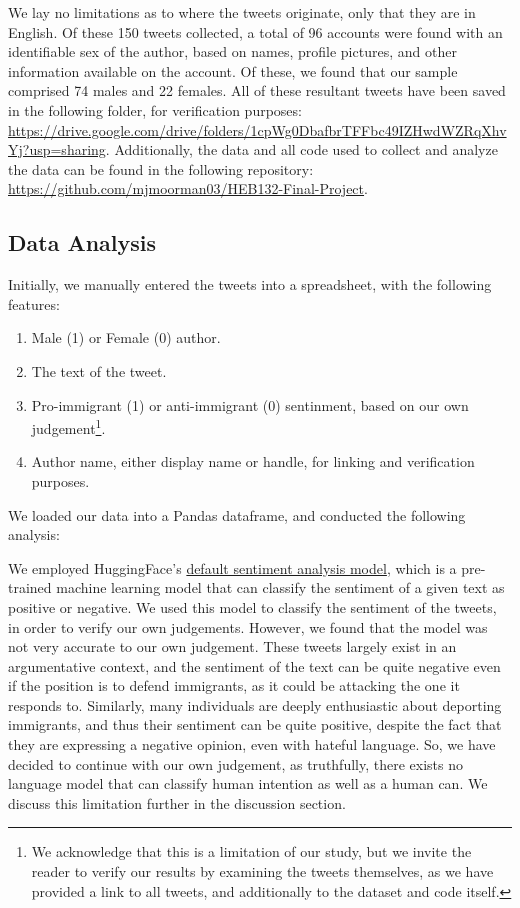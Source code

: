 \documentclass{article}
\begin{document}
We lay no limitations as to where the tweets originate, only that they are in English. Of these 150 tweets collected, a total of 96 accounts were found with an identifiable sex of the author, based on names, profile pictures, and other information available on the account. Of these, we found that our sample comprised 74 males and 22 females. All of these resultant tweets have been saved in the following folder, for verification purposes: \url{https://drive.google.com/drive/folders/1cpWg0DbafbrTFFbc49IZHwdWZRqXhvYj?usp=sharing}. Additionally, the data and all code used to collect and analyze the data can be found in the following repository: \url{https://github.com/mjmoorman03/HEB132-Final-Project}.

\subsection{Data Analysis}
Initially, we manually entered the tweets into a spreadsheet, with the following features:
\begin{enumerate}
    \item Male (1) or Female (0) author.
    \item The text of the tweet.
    \item Pro-immigrant (1) or anti-immigrant (0) sentinment, based on our own judgement\footnote{We acknowledge that this is a limitation of our study, but we invite the reader to verify our results by examining the tweets themselves, as we have provided a link to all tweets, and additionally to the dataset and code itself.}.
    \item Author name, either display name or handle, for linking and verification purposes.
\end{enumerate}

We loaded our data into a Pandas dataframe, and conducted the following analysis:

We employed HuggingFace's \href{https://huggingface.co/distilbert/distilbert-base-uncased-finetuned-sst-2-english?text=the+rainy+day+made+him+feel+quite+down}{default sentiment analysis model}, which is a pre-trained machine learning model that can classify the sentiment of a given text as positive or negative. We used this model to classify the sentiment of the tweets, in order to verify our own judgements. However, we found that the model was not very accurate to our own judgement. These tweets largely exist in an argumentative context, and the sentiment of the text can be quite negative even if the position is to defend immigrants, as it could be attacking the one it responds to. Similarly, many individuals are deeply enthusiastic about deporting immigrants, and thus their sentiment can be quite positive, despite the fact that they are expressing a negative opinion, even with hateful language. So, we have decided to continue with our own judgement, as truthfully, there exists no language model that can classify human intention as well as a human can. We discuss this limitation further in the discussion section.
\end{document}
